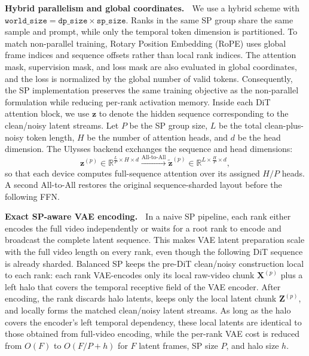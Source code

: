 \documentclass{llmxive}
\begin{document}
\textbf{Hybrid parallelism and global coordinates.} $\;$
We use a hybrid scheme with $\texttt{world\_size}=\texttt{dp\_size}\times\texttt{sp\_size}$.
Ranks in the same SP group share the same sample and prompt, while only the temporal token dimension is partitioned.
To match non-parallel training, Rotary Position Embedding (RoPE) uses global frame indices and sequence offsets rather than local rank indices.
The attention mask, supervision mask, and loss mask are also evaluated in global coordinates, and the loss is normalized by the global number of valid tokens.
Consequently, the SP implementation preserves the same training objective as the non-parallel formulation while reducing per-rank activation memory.
Inside each DiT attention block, we use $\mathbf{z}$ to denote the hidden sequence corresponding to the clean/noisy latent streams. Let $P$ be the SP group size, $L$ be the total clean-plus-noisy token length, $H$ be the number of attention heads, and $d$ be the head dimension. The Ulysses backend exchanges the sequence and head dimensions:
\begin{equation}
    \mathbf{z}^{(p)} \in \mathbb{R}^{\frac{L}{P} \times H \times d}
    \xrightarrow{\text{All-to-All}}
    \widetilde{\mathbf{z}}^{(p)} \in
    \mathbb{R}^{L \times \frac{H}{P} \times d},
\end{equation}
so that each device computes full-sequence attention over its assigned $H/P$ heads.
A second All-to-All restores the original sequence-sharded layout before the following FFN.

\textbf{Exact SP-aware VAE encoding.} $\;$
In a naive SP pipeline, each rank either encodes the full video independently or waits for a root rank to encode and broadcast the complete latent sequence.
This makes VAE latent preparation scale with the full video length on every rank, even though the following DiT sequence is already sharded.
Balanced SP keeps the pre-DiT clean/noisy construction local to each rank: each rank VAE-encodes only its local raw-video chunk $\mathbf{X}^{(p)}$ plus a left halo that covers the temporal receptive field of the VAE encoder.
After encoding, the rank discards halo latents, keeps only the local latent chunk $\mathbf{Z}^{(p)}$, and locally forms the matched clean/noisy latent streams.
As long as the halo covers the encoder's left temporal dependency, these local latents are identical to those obtained from full-video encoding, while the per-rank VAE cost is reduced from $O(F)$ to $O(F/P+h)$ for $F$ latent frames, SP size $P$, and halo size $h$.
\end{document}
